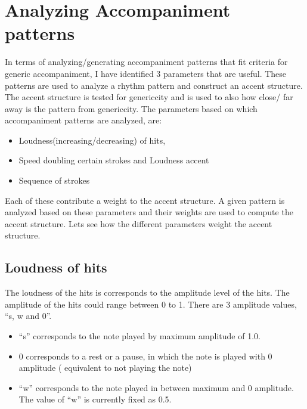 
\section{Analyzing Accompaniment patterns}

In terms of analyzing/generating accompaniment patterns that fit criteria for generic accompaniment, I have identified 3 parameters that are useful. These patterns are used to analyze a rhythm pattern and construct an accent structure. The accent structure is tested for genericcity and is used to also how close/ far away is the pattern from genericcity. The parameters based on which accompaniment patterns are analyzed, are:

\begin{itemize}

\item Loudness(increasing/decreasing) of hits, 
\item Speed doubling certain strokes and Loudness accent
\item Sequence of strokes

\end{itemize}

Each of these contribute a weight to the accent structure. A given pattern is analyzed based on these parameters and their weights are used to compute the accent structure. Lets see how the different parameters weight the accent structure.

\subsection{Loudness of hits}

The loudness of the hits is corresponds to the amplitude level of the hits. The amplitude of the hits could range between 0 to 1. There are 3 amplitude values, ``s, w and 0''.

\begin{itemize}

\item  ``s'' corresponds to the note played by maximum amplitude of 1.0.

\item 0 corresponds to a rest or a pause, in which the note is played with 0 amplitude ( equivalent to not playing the note)

\item ``w'' corresponds to the note played in between maximum and 0 amplitude. The value of ``w'' is currently fixed as 0.5.

\end{itemize}

